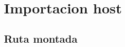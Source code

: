 \documentclass{report}
\begin{document}
\chapter{Importacion host}
\section{Ruta montada}
\end{document}
